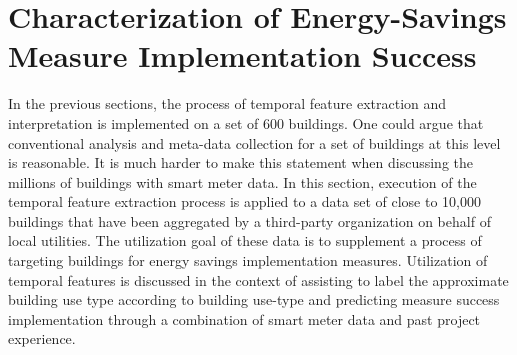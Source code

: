 \section{Characterization of Energy-Savings Measure Implementation Success}
\label{sec:scalability}

In the previous sections, the process of temporal feature extraction and interpretation is implemented on a set of 600 buildings. One could argue that conventional analysis and meta-data collection for a set of buildings at this level is reasonable. It is much harder to make this statement when discussing the millions of buildings with smart meter data. In this section, execution of the temporal feature extraction process is applied to a data set of close to 10,000 buildings that have been aggregated by a third-party organization on behalf of local utilities. The utilization goal of these data is to supplement a process of targeting buildings for energy savings implementation measures. Utilization of temporal features is discussed in the context of assisting to label the approximate building use type according to building use-type and predicting measure success implementation through a combination of smart meter data and past project experience.


